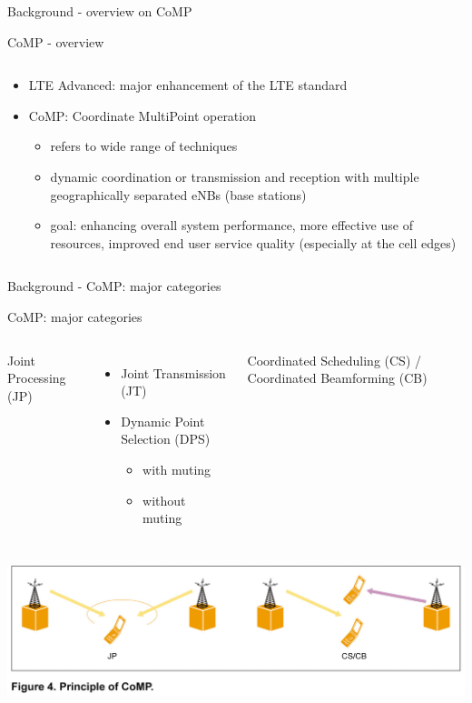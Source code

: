 \documentclass[xcolor={cmyk}]{beamer}
\begin{document}
 
 \begin{frame}{Background - overview on CoMP}
 	\begin{block}{CoMP - overview}
		\begin{columns}
			\begin{column}{.9\textwidth}
				\begin{itemize}
					\item LTE Advanced: major enhancement of the LTE standard
					\item CoMP: Coordinate MultiPoint operation
					\begin{itemize}
						\item refers to wide range of techniques
						\item dynamic coordination or transmission and reception with multiple geographically separated eNBs (base stations)
						\item goal: enhancing overall system performance, more effective use of resources, improved end user service quality (especially at the cell edges)
					\end{itemize}
				\end{itemize}
			\end{column}
		\end{columns}
	 \end{block}
 \end{frame}
 
 \begin{frame}{Background - CoMP: major categories}
 	\begin{block}{CoMP: major categories}
		\begin{columns}
			Joint Processing (JP)
				\begin{itemize}
					\item Joint Transmission (JT)
					\item Dynamic Point Selection (DPS)
					\begin{itemize}
						\item with muting
						\item without muting
					\end{itemize}
				\end{itemize}			
			\column{.5\textwidth}
				Coordinated Scheduling (CS) / Coordinated Beamforming (CB)
		\end{columns}
		 \includegraphics[width=\linewidth,height=\textheight,keepaspectratio]{W020101021303791421974.jpg}
	 \end{block}
 \end{frame}
 
\end{document}
